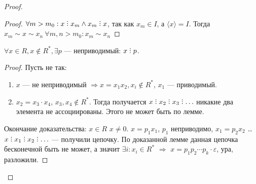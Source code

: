 \begin{proof}
\begin{proof}
        $\forall m > m_0: x \divby x_m \land x_m \divby x$, так как $x_m \in I$, а  $\langle x \rangle = I$. Тогда  $x_m \sim x \sim x_n\ \forall m, n > m_0\!: x_m \sim x_n$
    \end{proof}
    \begin{consequence}
        $\forall x \in R, x \not \in R^*,  \exists p$ --- неприводимый:  $x \divby p$.
    \end{consequence}
    \begin{proof}
        Пусть не так:
        \begin{enumerate}
            \item $x$ --- не неприводимый  $\Rightarrow x = x_1x_2, x_i \not \in R^*$, $x_1$ --- приводимый.
            \item $x_2 = x_3 \cdot x_4$, $x_3, x_4 \not \in R^*$. Тогда получается $x \divby x_2 \divby x_3 \divby \ldots$ никакие два элемента не ассоциированы. Этого не может быть по лемме. 
        \end{enumerate}

        Окончание доказательства: $x \in R$  $x \neq 0$.  $x = p_1 x_1$, $p_1$ неприводимо, $x_1 = p_2x_2$ \ldots $x \divby x_1 \divby x_2 \divby \ldots$ --- получили цепочку. По доказанной лемме данная цепочка бесконечной быть не может, а значит $\exists i : x_i \in R^*$ $\Rightarrow$ $x=p_1 p_2 \cdots p_k \cdot \varepsilon$, ура, разложили.
    \end{proof}
\end{proof}

